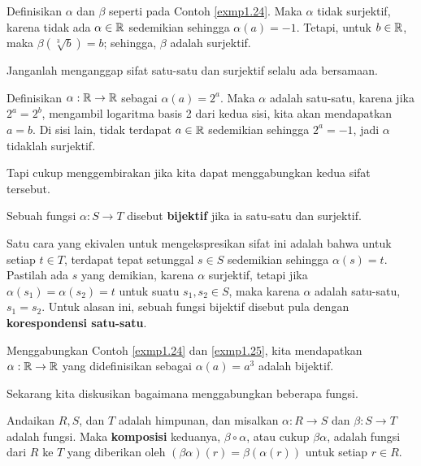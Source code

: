 \begin{exmp}
\label{exmp1.25}
Definisikan $\alpha$ dan $\beta$ seperti pada Contoh \ref{exmp1.24}. Maka $\alpha$ tidak surjektif, karena tidak ada $\alpha \in \mathbb{R}$ sedemikian sehingga $\alpha(a) = -1$. Tetapi, untuk $b \in \mathbb{R}$, maka $\beta(\sqrt[3]{b}) = b$; sehingga, $\beta$ adalah surjektif.
\end{exmp}

Janganlah menganggap sifat satu-satu dan surjektif selalu ada bersamaan.

\begin{exmp}
\label{exmp1.26}
Definisikan $\alpha : \mathbb{R} \rightarrow \mathbb{R}$ sebagai $\alpha(a) = 2^a$. Maka $\alpha$ adalah satu-satu, karena jika $2^a = 2^b$, mengambil logaritma basis 2 dari kedua sisi, kita akan mendapatkan $a = b$. Di sisi lain, tidak terdapat $a \in \mathbb{R}$ sedemikian sehingga $2^a = -1$, jadi $\alpha$ tidaklah surjektif.
\end{exmp}

Tapi cukup menggembirakan jika kita dapat menggabungkan kedua sifat tersebut.

\begin{defn}
Sebuah fungsi $\alpha : S \rightarrow T$ disebut \textbf{bijektif} jika ia satu-satu dan surjektif.
\end{defn}

Satu cara yang ekivalen untuk mengekspresikan sifat ini adalah bahwa untuk setiap $t \in T$, terdapat tepat setunggal $s \in S$ sedemikian sehingga $\alpha(s) = t$. Pastilah ada $s$ yang demikian, karena $\alpha$ surjektif, tetapi jika $\alpha(s_1) = \alpha(s_2) = t$ untuk suatu $s_1, s_2 \in S$, maka karena $\alpha$ adalah satu-satu, $s_1 = s_2$. Untuk alasan ini, sebuah fungsi bijektif disebut pula dengan \textbf{korespondensi satu-satu}.

\begin{exmp}
\label{exmp1.27}
Menggabungkan Contoh \ref{exmp1.24} dan \ref{exmp1.25}, kita mendapatkan $\alpha : \mathbb{R} \rightarrow \mathbb{R}$ yang didefinisikan sebagai $\alpha(a) = a^3$ adalah bijektif.
\end{exmp}

Sekarang kita diskusikan bagaimana menggabungkan beberapa fungsi.

\begin{defn}
Andaikan $R, S$, dan $T$ adalah himpunan, dan misalkan $\alpha : R \rightarrow S$ dan $\beta : S \rightarrow T$ adalah fungsi. Maka \textbf{komposisi} keduanya, $\beta \circ \alpha$, atau cukup $\beta \alpha$, adalah fungsi dari $R$ ke $T$ yang diberikan oleh $(\beta \alpha)(r) = \beta(\alpha(r))$ untuk setiap $r \in R$.
\end{defn}

